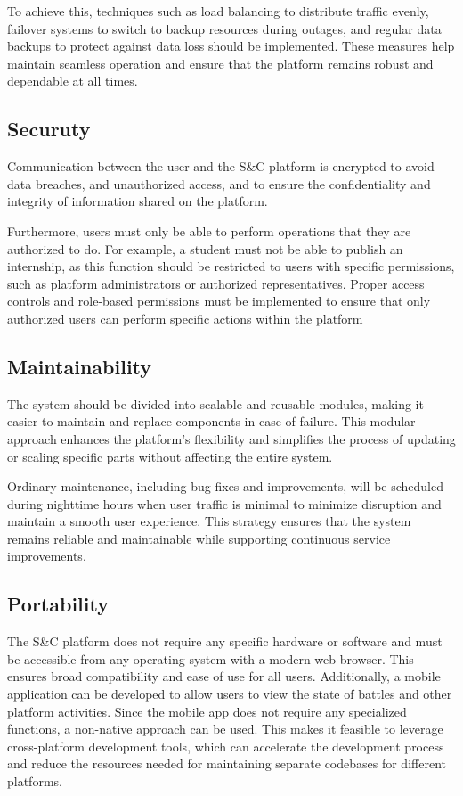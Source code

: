 To achieve this, techniques such as load balancing to distribute traffic evenly, failover systems to switch to backup resources during outages, and regular data backups to protect against data loss should be implemented. These measures help maintain seamless operation and ensure that the platform remains robust and dependable at all times.

\subsection{Securuty}

Communication between the user and the S\&C platform is encrypted to avoid data breaches, and unauthorized access, and to ensure the confidentiality and integrity of information shared on the platform.

Furthermore, users must only be able to perform operations that they are authorized to do. For example, a student must not be able to publish an internship, as this function should be restricted to users with specific permissions, such as platform administrators or authorized representatives. Proper access controls and role-based permissions must be implemented to ensure that only authorized users can perform specific actions within the platform

 \pagebreak
\subsection{Maintainability}

The system should be divided into scalable and reusable modules, making it easier to maintain and replace components in case of failure. This modular approach enhances the platform's flexibility and simplifies the process of updating or scaling specific parts without affecting the entire system. 

Ordinary maintenance, including bug fixes and improvements, will be scheduled during nighttime hours when user traffic is minimal to minimize disruption and maintain a smooth user experience. This strategy ensures that the system remains reliable and maintainable while supporting continuous service improvements.

\subsection{Portability}

The S\&C platform does not require any specific hardware or software and must be accessible from any operating system with a modern web browser. This ensures broad compatibility and ease of use for all users. Additionally, a mobile application can be developed to allow users to view the state of battles and other platform activities. Since the mobile app does not require any specialized functions, a non-native approach can be used. This makes it feasible to leverage cross-platform development tools, which can accelerate the development process and reduce the resources needed for maintaining separate codebases for different platforms.